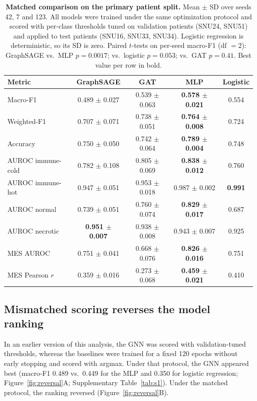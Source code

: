 \documentclass[11pt,letterpaper]{article}
\begin{document}
\begin{table}[H]
\centering
\caption{\textbf{Matched comparison on the primary patient split.} Mean $\pm$ SD over seeds 42, 7 and 123. All models were trained under the same optimization protocol and scored with per-class thresholds tuned on validation patients (SNU24, SNU51) and applied to test patients (SNU16, SNU33, SNU34). Logistic regression is deterministic, so its SD is zero. Paired $t$-tests on per-seed macro-F1 (df $= 2$): GraphSAGE vs.\ MLP $p = 0.0017$; vs.\ logistic $p = 0.053$; vs.\ GAT $p = 0.41$. Best value per row in bold.}
\label{tab:comparison}
\small
\begin{tabular}{lcccc}
\toprule
\textbf{Metric} & \textbf{GraphSAGE} & \textbf{GAT} & \textbf{MLP} & \textbf{Logistic} \\
\midrule
Macro-F1            & 0.489 $\pm$ 0.027 & 0.539 $\pm$ 0.063 & \textbf{0.578 $\pm$ 0.021} & 0.554 \\
Weighted-F1         & 0.707 $\pm$ 0.071 & 0.738 $\pm$ 0.051 & \textbf{0.764 $\pm$ 0.008} & 0.724 \\
Accuracy            & 0.750 $\pm$ 0.050 & 0.742 $\pm$ 0.064 & \textbf{0.789 $\pm$ 0.004} & 0.748 \\
AUROC immune-cold   & 0.782 $\pm$ 0.108 & 0.805 $\pm$ 0.069 & \textbf{0.838 $\pm$ 0.012} & 0.760 \\
AUROC immune-hot    & 0.947 $\pm$ 0.051 & 0.953 $\pm$ 0.018 & 0.987 $\pm$ 0.002 & \textbf{0.991} \\
AUROC normal        & 0.739 $\pm$ 0.051 & 0.760 $\pm$ 0.074 & \textbf{0.829 $\pm$ 0.017} & 0.687 \\
AUROC necrotic      & \textbf{0.951 $\pm$ 0.007} & 0.938 $\pm$ 0.008 & 0.943 $\pm$ 0.007 & 0.925 \\
MES AUROC           & 0.751 $\pm$ 0.041 & 0.668 $\pm$ 0.076 & \textbf{0.826 $\pm$ 0.016} & 0.751 \\
MES Pearson $r$     & 0.359 $\pm$ 0.016 & 0.273 $\pm$ 0.068 & \textbf{0.459 $\pm$ 0.021} & 0.410 \\
\bottomrule
\end{tabular}
\end{table}

\subsection{Mismatched scoring reverses the model ranking}

In an earlier version of this analysis, the GNN was scored with validation-tuned thresholds, whereas the baselines were trained for a fixed 120 epochs without early stopping and scored with argmax. Under that protocol, the GNN appeared best (macro-F1 0.489 vs.\ 0.449 for the MLP and 0.350 for logistic regression; Figure~\ref{fig:reversal}A; Supplementary Table~\ref{tab:s1}). Under the matched protocol, the ranking reversed (Figure~\ref{fig:reversal}B).
\end{document}
